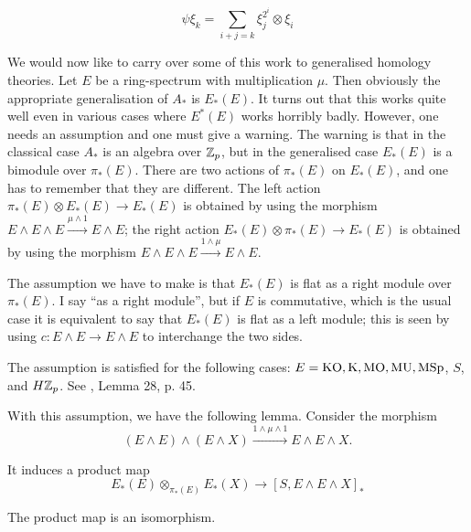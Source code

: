 \documentclass[../main]{subfiles}
\begin{document}
\begin{proposition} \label{prop:p3ch12.4}
\[ \psi\xi_k = \sum_{i+j=k}\xi_j^{2^i}\otimes\xi_i \]
\end{proposition}

We would now like to carry over some of this work to generalised homology theories. Let $E$ be a ring-spectrum with multiplication $\mu$. Then obviously the appropriate generalisation of $A_\ast$ is $E_\ast(E)$. It turns out that this works quite well even in various cases where $E^\ast(E)$ works horribly badly. However, one needs an assumption and one must give a warning. The warning is that in the classical case $A_\ast$ is an algebra over $\mathbb{Z}_p$, but in the generalised case $E_\ast(E)$ is a bimodule over $\pi_\ast(E)$. There are two actions of $\pi_\ast(E)$ on $E_\ast(E)$, and one has to remember that they are different. The left action $\pi_\ast(E)\otimes E_\ast(E)\longrightarrow E_\ast(E)$ is obtained by using the morphism $E\wedge E\wedge E\overset{\mu\wedge1}\longrightarrow E\wedge E$; the right action $E_\ast(E)\otimes\pi_\ast(E)\longrightarrow E_\ast(E)$ is obtained by using the morphism $E\wedge E\wedge E\overset{1\wedge\mu}\longrightarrow E\wedge E$.

The assumption we have to make is that $E_\ast(E)$ is flat as a right module over $\pi_\ast(E)$. I say ``as a right module'', but if $E$ is commutative, which is the usual case it is equivalent to say that $E_\ast(E)$ is flat as a left module; this is seen by using $c\colon E\wedge E\longrightarrow E\wedge E$ to interchange the two sides.

The assumption is satisfied for the following cases: \newline $E=\mathrm{KO, K, MO, MU, MSp}$, $S$, and $H\mathbb{Z}_p$. %
See \cite{adams3}, Lemma 28, p. 45.

With this assumption, we have the following lemma. Consider the morphism
\[ (E\wedge E)\wedge (E\wedge X)\xrightarrow{1\wedge\mu\wedge1} E\wedge E\wedge X . \]

It induces a product map
\[ E_\ast(E)\otimes_{\pi_\ast(E)}E_\ast(X)\longrightarrow[S,E\wedge E\wedge X]_\ast \]

\begin{lemma} \label{lem:p3ch12.5}
The product map is an isomorphism.
\end{lemma}
\end{document}
